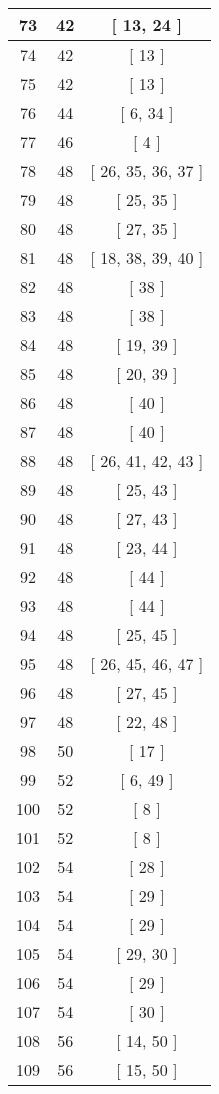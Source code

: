 \begin{center}
\begin{longtable}[H]{|| c c c ||}
\hline
73 & 42 & [ 13, 24 ] \\ 
\hline
74 & 42 & [ 13 ] \\ 
\hline
75 & 42 & [ 13 ] \\ 
\hline
76 & 44 & [ 6, 34 ] \\ 
\hline
77 & 46 & [ 4 ] \\ 
\hline
78 & 48 & [ 26, 35, 36, 37 ] \\ 
\hline
79 & 48 & [ 25, 35 ] \\ 
\hline
80 & 48 & [ 27, 35 ] \\ 
\hline
81 & 48 & [ 18, 38, 39, 40 ] \\ 
\hline
82 & 48 & [ 38 ] \\ 
\hline
83 & 48 & [ 38 ] \\ 
\hline
84 & 48 & [ 19, 39 ] \\ 
\hline
85 & 48 & [ 20, 39 ] \\ 
\hline
86 & 48 & [ 40 ] \\ 
\hline
87 & 48 & [ 40 ] \\ 
\hline
88 & 48 & [ 26, 41, 42, 43 ] \\ 
\hline
89 & 48 & [ 25, 43 ] \\ 
\hline
90 & 48 & [ 27, 43 ] \\ 
\hline
91 & 48 & [ 23, 44 ] \\ 
\hline
92 & 48 & [ 44 ] \\ 
\hline
93 & 48 & [ 44 ] \\ 
\hline
94 & 48 & [ 25, 45 ] \\ 
\hline
95 & 48 & [ 26, 45, 46, 47 ] \\ 
\hline
96 & 48 & [ 27, 45 ] \\ 
\hline
97 & 48 & [ 22, 48 ] \\ 
\hline
98 & 50 & [ 17 ] \\ 
\hline
99 & 52 & [ 6, 49 ] \\ 
\hline
100 & 52 & [ 8 ] \\ 
\hline
101 & 52 & [ 8 ] \\ 
\hline
102 & 54 & [ 28 ] \\ 
\hline
103 & 54 & [ 29 ] \\ 
\hline
104 & 54 & [ 29 ] \\ 
\hline
105 & 54 & [ 29, 30 ] \\ 
\hline
106 & 54 & [ 29 ] \\ 
\hline
107 & 54 & [ 30 ] \\ 
\hline
108 & 56 & [ 14, 50 ] \\ 
\hline
109 & 56 & [ 15, 50 ] \\ 

\end{longtable}
\end{center}
